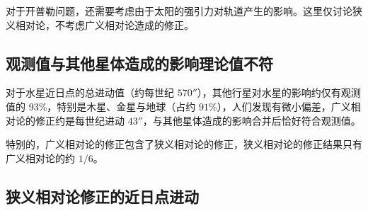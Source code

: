 

对于开普勒问题，还需要考虑由于太阳的强引力对轨道产生的影响。这里仅讨论狭义相对论，不考虑广义相对论造成的修正。

\subsection{观测值与其他星体造成的影响理论值不符}
对于水星近日点的总进动值（约每世纪 $570''$），其他行星对水星的影响约仅有观测值的 $93 \%$，特别是木星、金星与地球（占约 $91\%$），人们发现有微小偏差，广义相对论的修正约是每世纪进动 $43''$，与其他星体造成的影响合并后恰好符合观测值。

特别的，广义相对论的修正包含了狭义相对论的修正，狭义相对论的修正结果只有广义相对论的约 $1/6$。

\subsection{狭义相对论修正的近日点进动}
